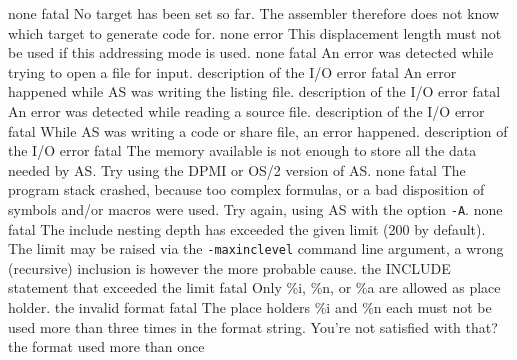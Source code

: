 \documentclass[12pt,twoside]{report}
\newcommand{\tty}[1]{{\tt #1}}
\newcommand{\asname}{{AS}}
\begin{document}
\begin{description}
               {none}
               {fatal}
               {No target has been set so far.  The assembler therefore does
                not know which target to generate code for.}
               {none}
               {error}
               {This displacement length must not be used if this addressing
                mode is used.}
               {none}
               {fatal}
               {An error was detected while trying to open a file for input.}
               {description of the I/O error}
               {fatal}
               {An error happened while \asname{} was writing the listing file.}
               {description of the I/O error}
               {fatal}
               {An error was detected while reading a source file.}
               {description of the I/O error}
               {fatal}
               {While \asname{} was writing a code or share file, an error happened.}
               {description of the I/O error}
               {fatal}
               {The memory available is not enough to store all the data
                needed by \asname{}. Try using the DPMI or OS/2 version of \asname{}.}
               {none}
               {fatal}
               {The program stack crashed, because too complex formulas, or
                a bad disposition of symbols and/or macros were used. Try
                again, using \asname{} with the option \tty{-A}.}
               {none}
               {fatal}
               {The include nesting depth has exceeded the given limit (200
                by default). The limit may be raised via the {\tt -maxinclevel}
                command line argument, a wrong (recursive) inclusion is however
                the more probable cause.}
               {the INCLUDE statement that exceeded the limit}
               {fatal}
               {Only  \%i, \%n, or \%a are allowed as place holder.}
               {the invalid format}
               {fatal}
               {The place holders \%i and \%n each must not be used more than
                three times in the format string.  You're not satisfied with that?}
               {the format used more than once}
\end{description}
\end{document}
